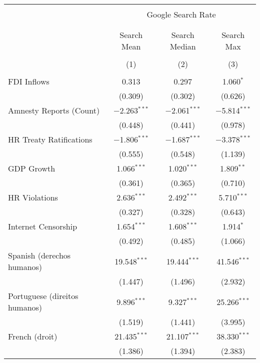 
\begin{table}[!htbp] \centering 
  \caption{} 
  \label{} 
\begin{tabular}{@{\extracolsep{5pt}}lccc} 
\\[-1.8ex]\hline 
\hline \\[-1.8ex] 
 & \multicolumn{3}{c}{Google Search Rate} \\ 
\cline{2-4} 
\\[-1.8ex] & \multicolumn{3}{c}{ } \\ 
 & Search Mean & Search Median & Search Max \\ 
\\[-1.8ex] & (1) & (2) & (3)\\ 
\hline \\[-1.8ex] 
 FDI Inflows & 0.313 & 0.297 & 1.060$^{*}$ \\ 
  & (0.309) & (0.302) & (0.626) \\ 
  Amnesty Reports (Count) & $-$2.263$^{***}$ & $-$2.061$^{***}$ & $-$5.814$^{***}$ \\ 
  & (0.448) & (0.441) & (0.978) \\ 
  HR Treaty Ratifications & $-$1.806$^{***}$ & $-$1.687$^{***}$ & $-$3.378$^{***}$ \\ 
  & (0.555) & (0.548) & (1.139) \\ 
  GDP Growth & 1.066$^{***}$ & 1.020$^{***}$ & 1.809$^{**}$ \\ 
  & (0.361) & (0.365) & (0.710) \\ 
  HR Violations & 2.636$^{***}$ & 2.492$^{***}$ & 5.710$^{***}$ \\ 
  & (0.327) & (0.328) & (0.643) \\ 
  Internet Censorship & 1.654$^{***}$ & 1.608$^{***}$ & 1.914$^{*}$ \\ 
  & (0.492) & (0.485) & (1.066) \\ 
  Spanish (derechos humanos) & 19.548$^{***}$ & 19.444$^{***}$ & 41.546$^{***}$ \\ 
  & (1.447) & (1.496) & (2.932) \\ 
  Portuguese (direitos humanos) & 9.896$^{***}$ & 9.327$^{***}$ & 25.266$^{***}$ \\ 
  & (1.519) & (1.441) & (3.995) \\ 
  French (droit) & 21.435$^{***}$ & 21.107$^{***}$ & 38.330$^{***}$ \\ 
  & (1.386) & (1.394) & (2.383) \\ 

\end{tabular}
\end{table}
